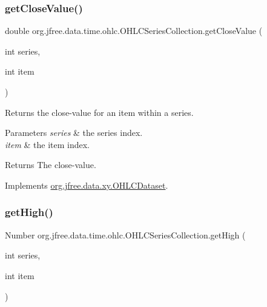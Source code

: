 \subsubsection{\texorpdfstring{get\+Close\+Value()}{getCloseValue()}}
{\footnotesize\ttfamily double org.\+jfree.\+data.\+time.\+ohlc.\+O\+H\+L\+C\+Series\+Collection.\+get\+Close\+Value (\begin{DoxyParamCaption}\item[{int}]{series,  }\item[{int}]{item }\end{DoxyParamCaption})}

Returns the close-\/value for an item within a series.


\begin{DoxyParams}{Parameters}
{\em series} & the series index. \\
\hline
{\em item} & the item index.\\
\hline
\end{DoxyParams}
\begin{DoxyReturn}{Returns}
The close-\/value. 
\end{DoxyReturn}


Implements \mbox{\hyperlink{interfaceorg_1_1jfree_1_1data_1_1xy_1_1_o_h_l_c_dataset_a5533f5d89de4aec9d67cfdc9289a1099}{org.\+jfree.\+data.\+xy.\+O\+H\+L\+C\+Dataset}}.

\mbox{\label{classorg_1_1jfree_1_1data_1_1time_1_1ohlc_1_1_o_h_l_c_series_collection_a8ff1342849ccce17620f04158a99792b}} 
\subsubsection{\texorpdfstring{get\+High()}{getHigh()}}
{\footnotesize\ttfamily Number org.\+jfree.\+data.\+time.\+ohlc.\+O\+H\+L\+C\+Series\+Collection.\+get\+High (\begin{DoxyParamCaption}\item[{int}]{series,  }\item[{int}]{item }\end{DoxyParamCaption})}

